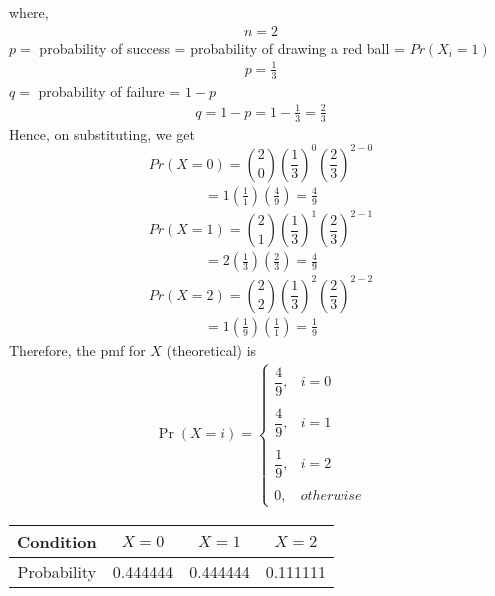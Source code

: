 \documentclass[journal,12pt,twocolumn]{IEEEtran}
\begin{document}
where,
\begin{align}
    \tag{5.25.8}
    n=2
\end{align}
\newline $p =$ probability of success = probability of drawing a red ball = $Pr(X_{i}=1)$
\begin{align}
    \tag{5.25.9}
    p=\frac{1}{3}
\end{align}
\newline $q =$ probability of failure = $1-p$
\begin{align}
    \tag{5.25.10}
    q=1-p=1-\frac{1}{3}=\frac{2}{3}
\end{align}
Hence, on substituting, we get
$$Pr(X=0)={2\choose 0}\left(\frac{1}{3}\right)^{0}\left(\frac{2}{3}\right)^{2-0}$$
\begin{align}
    \tag{5.25.11}
    =1\left(\frac{1}{1}\right)\left(\frac{4}{9}\right)=\frac{4}{9}
\end{align}
$$Pr(X=1)={2\choose 1}\left(\frac{1}{3}\right)^{1}\left(\frac{2}{3}\right)^{2-1}$$
\begin{align}     
    \tag{5.25.12}
    =2\left(\frac{1}{3}\right)\left(\frac{2}{3}\right)=\frac{4}{9}
\end{align}
$$Pr(X=2)={2\choose 2}\left(\frac{1}{3}\right)^{2}\left(\frac{2}{3}\right)^{2-2}$$
\begin{align}
     \tag{5.25.13}
    =1\left(\frac{1}{9}\right)\left(\frac{1}{1}\right)=\frac{1}{9}
\end{align}
Therefore, the pmf for $X$ (theoretical) is
\begin{align}
    \tag{5.25.14}
    \Pr(X=i) = 
	\begin{cases}
	\dfrac{4}{9}, & i=0 \\~\\[-1em]
	\dfrac{4}{9}, & i=1 \\~\\[-1em]
	\dfrac{1}{9}, & i=2 \\~\\[-1em]
	0, & otherwise
	\end{cases}
\end{align}
\newline
\newline
\begin{tabular}{|c|c|c|c|}
    \hline
    Condition & $X = 0$& $X =1 $& $X=2$ \\
    \hline
    Probability & 0.444444 & 0.444444 & 0.111111\\
    \hline
\end{tabular}
\newline
\end{document}
